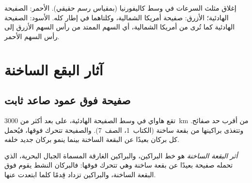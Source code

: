 \begin{omfigure}

{\small إغلاق مثلث السرعات في وسط كاليفورنيا (بمقياس رسم حقيقي). الأحمر:
الصفيحة الهادئية؛ الأزرق: صفيحة أمريكا الشمالية، وكلتاهما في إطار
 كله. الأسود: الصفيحة الهادئية كما تُرى من أمريكا الشمالية، أي
السهم الممتد من رأس السهم الأزرق إلى رأس السهم الأحمر.}
\end{omfigure}

\section{آثار البقع الساخنة}

\subsection{صفيحة فوق عمود صاعد ثابت}

تقع هاواي في وسط الصفيحة الهادئية، على بعد أكثر من \qty{3000}{km}
من أقرب حد صفائح.
 وتتغذى براكينها من بقعة ساخنة (الكتاب~1،
الصف~7). والصفيحة تتحرك فوقها، فيُحمل كل بركان بعيدًا عن
البقعة الساخنة بينما ينمو بركان جديد خلفه.

\begin{definition}\label{def:g11:plate-motions:hotspot-track}
\emph{أثر البقعة الساخنة} هو خط البراكين،
والبراكين الغارقة المسماة الجبال البحرية، الذي تحمله صفيحة بعيدًا عن
بقعة ساخنة وهي تتحرك فوقها: فالبركان النشط يقوم فوق البقعة الساخنة،
والبراكين تزداد قِدمًا كلما ابتعدت عنها.
\end{definition}

